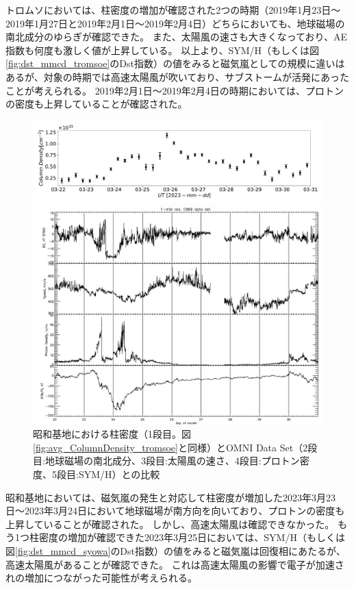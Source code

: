 トロムソにおいては、柱密度の増加が確認された2つの時期（2019年1月23日〜2019年1月27日と2019年2月1日〜2019年2月4日）どちらにおいても、地球磁場の南北成分のゆらぎが確認できた。
また、太陽風の速さも大きくなっており、AE指数も何度も激しく値が上昇している。
以上より、SYM/H（もしくは図\ref{fig:dst_mmcd_tromsoe}のDst指数）の値をみると磁気嵐としての規模に違いはあるが、対象の時期では高速太陽風が吹いており、サブストームが活発にあったことが考えられる。
2019年2月1日〜2019年2月4日の時期においては、プロトンの密度も上昇していることが確認された。\par
\begin{figure}[htbp]
    \centering
    \begin{minipage}{\linewidth}
        \centering
        \includegraphics[width=\linewidth]{master_thesis_contents/master_thesis_fig/column_density_spectr6_syowa.pdf}
    \end{minipage}
    \begin{minipage}{0.96\linewidth}
        \centering
        \includegraphics[width=\linewidth]{master_thesis_contents/master_thesis_fig/omni_syowa.pdf}
    \end{minipage}
    \caption{昭和基地における柱密度（1段目。図\ref{fig:avg_ColumnDensity_tromsoe}と同様）とOMNI Data Set（2段目:地球磁場の南北成分、3段目:太陽風の速さ、4段目:プロトン密度、5段目:SYM/H）との比較}
    \label{fig:omni_mmcd_syowa}
\end{figure}

昭和基地においては、磁気嵐の発生と対応して柱密度が増加した2023年3月23日〜2023年3月24日において地球磁場が南方向を向いており、プロトンの密度も上昇していることが確認された。
しかし、高速太陽風は確認できなかった。
もう1つ柱密度の増加が確認できた2023年3月25日においては、SYM/H（もしくは図\ref{fig:dst_mmcd_syowa}のDst指数）の値をみると磁気嵐は回復相にあたるが、高速太陽風があることが確認できた。
これは高速太陽風の影響で電子が加速されの増加につながった可能性が考えられる。
